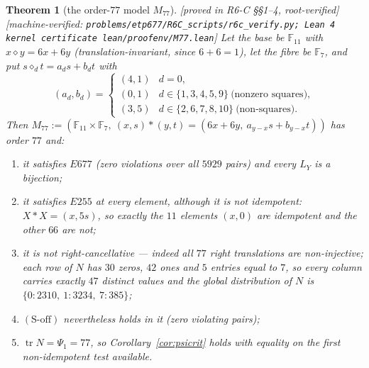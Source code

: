 \documentclass[11pt]{article}
\theoremstyle{plain}
\newtheorem{theorem}{Theorem}[section]
\theoremstyle{definition}
\theoremstyle{remark}
\numberwithin{equation}{section}
\newcommand{\F}{\mathbb{F}}
\newcommand{\op}{\mathbin{*}}
\newcommand{\tr}{\operatorname{tr}}
\newcommand{\statusbox}[1]{{\small\sloppy\textsf{[#1]}}}
\newcommand{\MV}[1]{\statusbox{machine-verified: \texttt{#1}}}
\newcommand{\PROVED}[1]{\statusbox{proved in #1, root-verified}}
\begin{document}
\begin{theorem}[the order-$77$ model $M_{77}$]\label{thm:m77}
\PROVED{R6-C \S\S1--4}\;%
\MV{problems\slash etp677\slash R6C\_scripts\slash r6c\_verify.py;
Lean~4 kernel certificate lean\slash proofenv\slash M77.lean}
Let the base be $\F_{11}$ with $x\diamond y = 6x+6y$ (translation-invariant, since
$6+6 = 1$), let the fibre be $\F_7$, and put $s\diamond_dt = a_ds+b_dt$ with
\[
  (a_d,b_d) =
  \begin{cases}
    (4,1) & d = 0,\\
    (0,1) & d \in\{1,3,4,5,9\}\ \text{(nonzero squares)},\\
    (3,5) & d \in\{2,6,7,8,10\}\ \text{(non-squares)} .
  \end{cases}
\]
Then $M_{77} := (\F_{11}\times\F_7,\ (x,s)\op(y,t) = (6x+6y,\ a_{y-x}s+b_{y-x}t))$
has order $77$ and:
\begin{enumerate}
\item[(a)] it satisfies $E677$ (zero violations over all $5929$ pairs) and every
$L_Y$ is a bijection;
\item[(b)] it satisfies $E255$ at every element, although it is \emph{not}
idempotent: $X\op X = (x,5s)$, so exactly the $11$ elements $(x,0)$ are
idempotent and the other $66$ are not;
\item[(c)] it is \emph{not} right-cancellative --- indeed all $77$ right
translations are non-injective; each row of $N$ has $30$ zeros, $42$ ones and $5$
entries equal to $7$, so every column carries exactly $47$ distinct values and the
global distribution of $N$ is $\{0\!:\!2310,\ 1\!:\!3234,\ 7\!:\!385\}$;
\item[(d)] $(\mathrm{S\text{-}off})$ nevertheless \emph{holds} in it (zero
violating pairs);
\item[(e)] $\tr N = \Psi_1 = 77$, so Corollary~\ref{cor:psicrit} holds with
equality on the first non-idempotent test available.
\end{enumerate}
\end{theorem}
\end{document}
